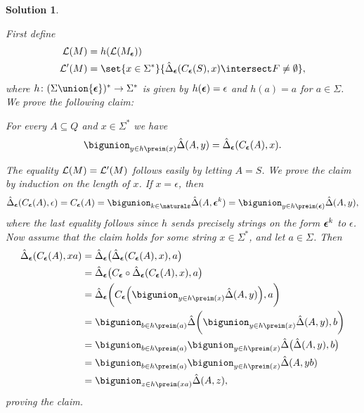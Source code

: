 \documentclass[article, a4paper, 11pt, oneside]{memoir}
\numberwithin{equation}{chapter}
\theoremstyle{nonumberplain}
\newtheorem{solution}{Solution}
\newenvironment{displaytheorem}{%
	\begin{displayquote}\itshape%
}{%
	\end{displayquote}%
}
\theoremstyle{myexample}
\theoremstyle{myexamplebreak}
\begin{document}
\begin{solution}
\begin{solutionsec}
    \item First define
    \begin{align*}
        \calL(M)
            &= h(\calL(M_{\Bepsilon})) \\
        \calL'(M)
            &= \set{x \in \Sigma^*}{\hat\Delta_{\Bepsilon}(C_{\Bepsilon}(S),x) \intersect F \neq \emptyset},
    \end{align*}
    where $h \colon (\Sigma \union \{\Bepsilon\})^* \to \Sigma^*$ is given by $h(\bm{\epsilon}) = \epsilon$ and $h(a) = a$ for $a \in \Sigma$. We prove the following claim:
    \begin{displaytheorem}
        For every $A \subseteq Q$ and $x \in \Sigma^*$ we have
        \begin{equation*}
            \bigunion_{y \in h\preim(x)} \hat\Delta(A,y)
                = \hat\Delta_{\Bepsilon}(C_{\Bepsilon}(A),x).
        \end{equation*}
    \end{displaytheorem}
    The equality $\mathcal{L}(M) = \mathcal{L}'(M)$ follows easily by letting $A = S$. We prove the claim by induction on the length of $x$. If $x = \epsilon$, then
    \begin{equation*}
        \hat\Delta_{\Bepsilon}(C_{\Bepsilon}(A),\epsilon)
            = C_{\Bepsilon}(A)
            = \bigunion_{k \in \naturals} \hat\Delta(A, \Bepsilon^k)
            = \bigunion_{y \in h\preim(\Bepsilon)} \hat\Delta(A,y),
    \end{equation*}
    where the last equality follows since $h$ sends precisely strings on the form $\bm{\epsilon}^k$ to $\epsilon$. Now assume that the claim holds for some string $x \in \Sigma^*$, and let $a \in \Sigma$. Then
    \begin{align*}
        \hat\Delta_{\Bepsilon}(C_{\Bepsilon}(A), xa)
            &= \hat\Delta_{\Bepsilon} \bigl( \hat\Delta_{\Bepsilon}(C_{\Bepsilon}(A), x), a \bigr) \\
            &= \hat\Delta_{\Bepsilon} \bigl( C_{\Bepsilon} \circ \hat\Delta_{\Bepsilon}(C_{\Bepsilon}(A), x), a \bigr) \\
            &= \hat\Delta_{\Bepsilon} \biggl( C_{\Bepsilon} \Bigl( \bigunion_{y \in h\preim(x)} \hat\Delta(A,y) \Bigr), a \biggr) \\
            &= \bigunion_{b \in h\preim(a)} \hat\Delta \biggl( \bigunion_{y \in h\preim(x)} \hat\Delta(A,y), b \biggr) \\
            &= \bigunion_{b \in h\preim(a)} \bigunion_{y \in h\preim(x)} \hat\Delta \bigl( \hat\Delta(A,y), b \bigr) \\
            &= \bigunion_{b \in h\preim(a)} \bigunion_{y \in h\preim(x)} \hat\Delta(A,yb) \\
            &= \bigunion_{z \in h\preim(xa)} \hat\Delta(A,z),
    \end{align*}
    proving the claim.
\end{solutionsec}
\end{solution}
\end{document}
